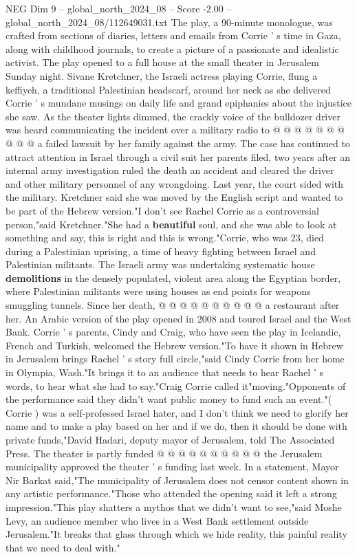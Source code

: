 \begin{textsample}{NEG Dim 9 – global\_north\_2024\_08 – Score -2.00 – global\_north\_2024\_08/112649031.txt}
The play, a 90-minute monologue, was crafted from sections of diaries, letters and emails from Corrie ' s time in Gaza, along with childhood journals, to create a picture of a passionate and idealistic activist.
The play opened to a full house at the small theater in Jerusalem Sunday night.
Sivane Kretchner, the Israeli actress playing Corrie, flung a keffiyeh, a traditional Palestinian headscarf, around her neck as she delivered Corrie ' s mundane musings on daily life and grand epiphanies about the injustice she saw.
As the theater lights dimmed, the crackly voice of the bulldozer driver was heard communicating the incident over a military radio to @ @ @ @ @ @ @ @ @ @ a failed lawsuit by her family against the army.
The case has continued to attract attention in Israel through a civil suit her parents filed, two years after an internal army investigation ruled the death an accident and cleared the driver and other military personnel of any wrongdoing.
Last year, the court sided with the military.
Kretchner said she was moved by the English script and wanted to be part of the Hebrew version."I don't see Rachel Corrie as a controversial person,"said Kretchner."She had a \textbf{beautiful} soul, and she was able to look at something and say, this is right and this is wrong."Corrie, who was 23, died during a Palestinian uprising, a time of heavy fighting between Israel and Palestinian militants.
The Israeli army was undertaking systematic house \textbf{demolitions} in the densely populated, violent area along the Egyptian border, where Palestinian militants were using houses as end points for weapons smuggling tunnels.
Since her death, @ @ @ @ @ @ @ @ @ @ a restaurant after her.
An Arabic version of the play opened in 2008 and toured Israel and the West Bank.
Corrie ' s parents, Cindy and Craig, who have seen the play in Icelandic, French and Turkish, welcomed the Hebrew version."To have it shown in Hebrew in Jerusalem brings Rachel ' s story full circle,"said Cindy Corrie from her home in Olympia, Wash."It brings it to an audience that needs to hear Rachel ' s words, to hear what she had to say."Craig Corrie called it"moving."Opponents of the performance said they didn't want public money to fund such an event."( Corrie ) was a self-professed Israel hater, and I don't think we need to glorify her name and to make a play based on her and if we do, then it should be done with private funds,"David Hadari, deputy mayor of Jerusalem, told The Associated Press.
The theater is partly funded @ @ @ @ @ @ @ @ @ @ the Jerusalem municipality approved the theater ' s funding last week.
In a statement, Mayor Nir Barkat said,"The municipality of Jerusalem does not censor content shown in any artistic performance."Those who attended the opening said it left a strong impression."This play shatters a mythos that we didn't want to see,"said Moshe Levy, an audience member who lives in a West Bank settlement outside Jerusalem."It breaks that glass through which we hide reality, this painful reality that we need to deal with."

\end{textsample}
